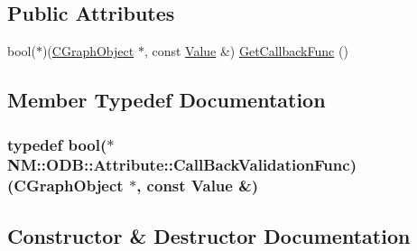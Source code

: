 \subsection*{Public Attributes}
\begin{DoxyCompactItemize}
\item 
bool($\ast$)(\hyperlink{class_n_m_1_1_o_d_b_1_1_c_graph_object}{C\+Graph\+Object} $\ast$, const \hyperlink{class_n_m_1_1_o_d_b_1_1_value}{Value} \&) \hyperlink{class_n_m_1_1_o_d_b_1_1_attribute_ac489ca70164c7274279189ebd5bdf881}{Get\+Callback\+Func} ()
\end{DoxyCompactItemize}


\subsection{Member Typedef Documentation}
\hypertarget{class_n_m_1_1_o_d_b_1_1_attribute_aecc2c30f3a77a56c4dc68b9961eb1fb7}{}
\subsubsection[{Call\+Back\+Validation\+Func}]{\setlength{\rightskip}{0pt plus 5cm}typedef bool($\ast$ N\+M\+::\+O\+D\+B\+::\+Attribute\+::\+Call\+Back\+Validation\+Func) ({\bf C\+Graph\+Object} $\ast$, const {\bf Value} \&)}\label{class_n_m_1_1_o_d_b_1_1_attribute_aecc2c30f3a77a56c4dc68b9961eb1fb7}


\subsection{Constructor \& Destructor Documentation}
\hypertarget{class_n_m_1_1_o_d_b_1_1_attribute_a3e7774f1121be2a5794640ada4c9129c}{}

